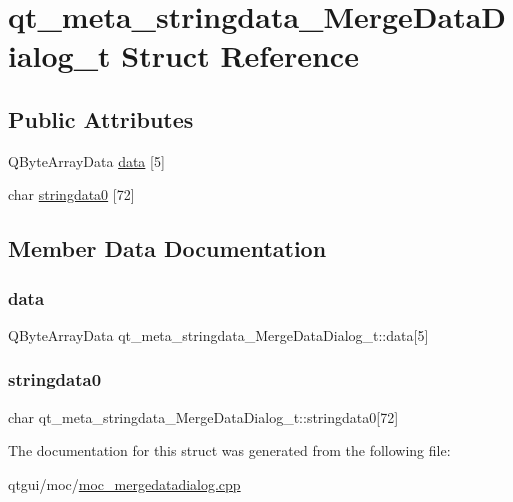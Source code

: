 \hypertarget{structqt__meta__stringdata___merge_data_dialog__t}{}\section{qt\+\_\+meta\+\_\+stringdata\+\_\+\+Merge\+Data\+Dialog\+\_\+t Struct Reference}
\label{structqt__meta__stringdata___merge_data_dialog__t}
\subsection*{Public Attributes}
\begin{DoxyCompactItemize}
\item 
Q\+Byte\+Array\+Data \mbox{\hyperlink{structqt__meta__stringdata___merge_data_dialog__t_af7a5dbb2f150cb5ef1af2a8bb21e6dfd}{data}} \mbox{[}5\mbox{]}
\item 
char \mbox{\hyperlink{structqt__meta__stringdata___merge_data_dialog__t_a7d5a06318b1480d41b1e741589c0bdfe}{stringdata0}} \mbox{[}72\mbox{]}
\end{DoxyCompactItemize}


\subsection{Member Data Documentation}
\mbox{\label{structqt__meta__stringdata___merge_data_dialog__t_af7a5dbb2f150cb5ef1af2a8bb21e6dfd}} 
\subsubsection{\texorpdfstring{data}{data}}
{\footnotesize\ttfamily Q\+Byte\+Array\+Data qt\+\_\+meta\+\_\+stringdata\+\_\+\+Merge\+Data\+Dialog\+\_\+t\+::data\mbox{[}5\mbox{]}}

\mbox{\label{structqt__meta__stringdata___merge_data_dialog__t_a7d5a06318b1480d41b1e741589c0bdfe}} 
\subsubsection{\texorpdfstring{stringdata0}{stringdata0}}
{\footnotesize\ttfamily char qt\+\_\+meta\+\_\+stringdata\+\_\+\+Merge\+Data\+Dialog\+\_\+t\+::stringdata0\mbox{[}72\mbox{]}}



The documentation for this struct was generated from the following file\+:\begin{DoxyCompactItemize}
\item 
qtgui/moc/\mbox{\hyperlink{moc__mergedatadialog_8cpp}{moc\+\_\+mergedatadialog.\+cpp}}\end{DoxyCompactItemize}
